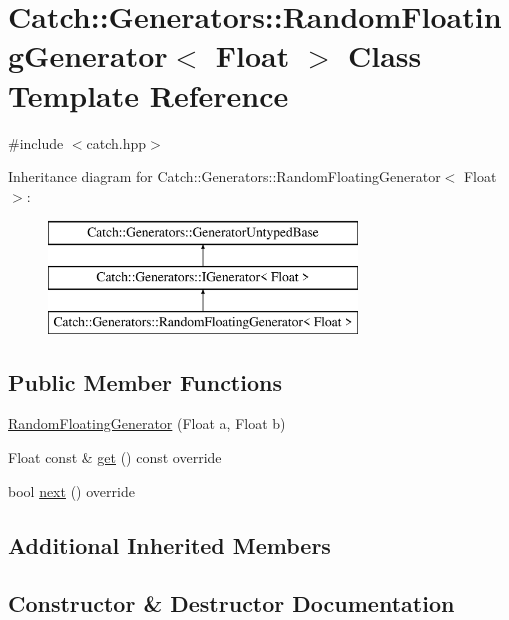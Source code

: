 \hypertarget{class_catch_1_1_generators_1_1_random_floating_generator}{}\section{Catch\+:\+:Generators\+:\+:Random\+Floating\+Generator$<$ Float $>$ Class Template Reference}
\label{class_catch_1_1_generators_1_1_random_floating_generator}


{\ttfamily \#include $<$catch.\+hpp$>$}

Inheritance diagram for Catch\+:\+:Generators\+:\+:Random\+Floating\+Generator$<$ Float $>$\+:\begin{figure}[H]
\begin{center}
\leavevmode
\includegraphics[height=3.000000cm]{class_catch_1_1_generators_1_1_random_floating_generator}
\end{center}
\end{figure}
\subsection*{Public Member Functions}
\begin{DoxyCompactItemize}
\item 
\mbox{\hyperlink{class_catch_1_1_generators_1_1_random_floating_generator_abce275ce88f7c3465addd7a98b6c408d}{Random\+Floating\+Generator}} (Float a, Float b)
\item 
Float const  \& \mbox{\hyperlink{class_catch_1_1_generators_1_1_random_floating_generator_a0dea6fa1f9e2647df022f0b588cf0a8f}{get}} () const override
\item 
bool \mbox{\hyperlink{class_catch_1_1_generators_1_1_random_floating_generator_a6a65e5f16abd884f58c31581b2a0d6db}{next}} () override
\end{DoxyCompactItemize}
\subsection*{Additional Inherited Members}


\subsection{Constructor \& Destructor Documentation}
\mbox{\label{class_catch_1_1_generators_1_1_random_floating_generator_abce275ce88f7c3465addd7a98b6c408d}} 

